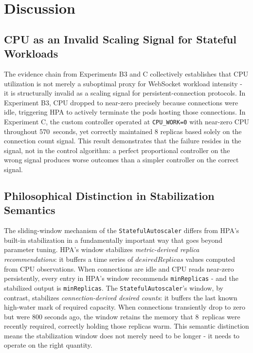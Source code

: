 \documentclass[twocolumn]{svjour3}
\begin{document}
\section{Discussion}
\label{sec:discussion}

\subsection{CPU as an Invalid Scaling Signal for Stateful Workloads}

The evidence chain from Experiments B3 and C collectively establishes that CPU utilization is not merely a suboptimal proxy for WebSocket workload intensity - it is structurally invalid as a scaling signal for persistent-connection protocols. In Experiment B3, CPU dropped to near-zero precisely because connections were idle, triggering HPA to actively terminate the pods hosting those connections. In Experiment C, the custom controller operated at \texttt{CPU\_WORK=0} with near-zero CPU throughout 570~seconds, yet correctly maintained 8 replicas based solely on the connection count signal. This result demonstrates that the failure resides in the signal, not in the control algorithm: a perfect proportional controller on the wrong signal produces worse outcomes than a simpler controller on the correct signal.

\subsection{Philosophical Distinction in Stabilization Semantics}

The sliding-window mechanism of the \texttt{StatefulAutoscaler} differs from HPA's built-in stabilization in a fundamentally important way that goes beyond parameter tuning. HPA's window stabilizes \textit{metric-derived replica recommendations}: it buffers a time series of $desiredReplicas$ values computed from CPU observations. When connections are idle and CPU reads near-zero persistently, every entry in HPA's window recommends \texttt{minReplicas} - and the stabilized output is \texttt{minReplicas}. The \texttt{StatefulAutoscaler}'s window, by contrast, stabilizes \textit{connection-derived desired counts}: it buffers the last known high-water mark of required capacity. When connections transiently drop to zero but were 800 seconds ago, the window retains the memory that 8~replicas were recently required, correctly holding those replicas warm. This semantic distinction means the stabilization window does not merely need to be longer - it needs to operate on the right quantity.
\end{document}
